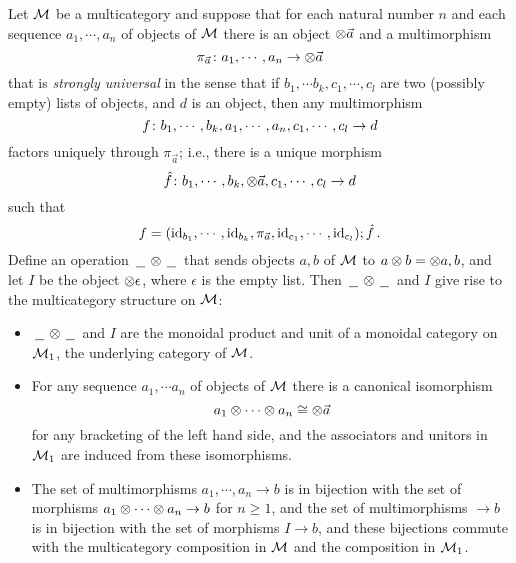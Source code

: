 \documentclass{article}
\begin{document}
\begin{theorem}
  \label{TheRepresentableMulticategories}
  Let $\mathcal M$ be a multicategory and suppose that for each natural number $n$ and each sequence $a_1,\cdots,a_n$ of objects of $\mathcal M$ there is an object $\otimes \vec{a}$ and a multimorphism
  \[
    \pi_{\vec a} \colon a_1,\cdots,a_n \to \otimes \vec a
    \]
  that is \emph{strongly universal} in the sense that if $b_1,\cdots b_k, c_1,\cdots,c_l$ are two (possibly empty) lists of objects, and $d$ is an object, then any multimorphism
  \[
    f \colon b_1,\cdots,b_k,a_1,\cdots,a_n,c_1,\cdots,c_l \to d
    \]
  factors uniquely through $\pi_{\vec a}$; i.e., there is a unique morphism
  \[
    \hat{f} \colon b_1,\cdots,b_k,\otimes\vec{a},c_1,\cdots,c_l \to d
    \]
  such that
  \[
    f=(\operatorname{id}_{b_1},\cdots,\operatorname{id}_{b_k},\pi_{\vec a},\operatorname{id}_{c_1},\cdots,\operatorname{id}_{c_l});\hat{f}\,.
    \]
  Define an operation $\,\underline{\hspace{1.5ex}}\,\otimes\,\underline{\hspace{1.5ex}}\,$ that sends objects $a,b$ of $\mathcal M$ to $a\otimes b = \otimes a,b$, and let $I$ be the object $\otimes\epsilon$, where $\epsilon$ is the empty list.  
  Then $\,\underline{\hspace{1.5ex}}\,\otimes\,\underline{\hspace{1.5ex}}\,$ and $I$ give rise to the multicategory structure on $\mathcal M$:
  \begin{itemize}
    \item $\,\underline{\hspace{1.5ex}}\,\otimes\,\underline{\hspace{1.5ex}}\,$ and $I$ are the monoidal product and unit of a monoidal category on $\mathcal M_1$, the underlying category of $\mathcal M$.
    \item For any sequence $a_1,\cdots a_n$ of objects of $\mathcal M$ there is a canonical isomorphism
      \[
        a_1 \otimes \cdots \otimes a_n \cong \otimes \vec a
        \]
      for any bracketing of the left hand side, and the associators and unitors in $\mathcal M_1$ are induced from these isomorphisms.
    \item The set of multimorphisms $a_1,\cdots,a_n \to b$ is in bijection with the set of morphisms $a_1\otimes\cdots\otimes a_n \to b$ for $n\ge1$, and the set of multimorphisms $\to b$ is in bijection with the set of morphisms $I \to b$, and these bijections commute with the multicategory composition in $\mathcal M$ and the composition in $\mathcal M_1$.
  \end{itemize}
\end{theorem}
\end{document}
